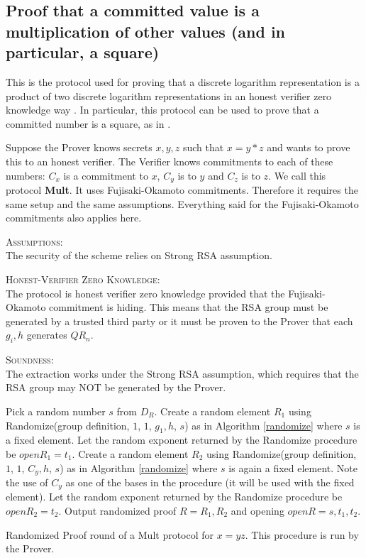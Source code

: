 \subsection{Proof that a committed value is a multiplication of other values (and in particular, a square)}

This is the protocol used for proving that a discrete logarithm representation is a product of two discrete logarithm representations in an honest verifier zero knowledge way \cite{FOcomm2}. In particular, this protocol can be used to prove that a committed number is a square, as in \cite{boudotInterval}.

Suppose the Prover knows secrets $x,y,z$ such that $x = y*z$ and wants to prove this to an honest verifier. The Verifier knows commitments to each of these numbers: $C_x$ is a commitment to $x$, $C_y$ is to $y$ and $C_z$ is to $z$. We call this protocol \textbf{Mult}. It uses Fujisaki-Okamoto commitments. Therefore it requires the same setup and the same assumptions. Everything said for the Fujisaki-Okamoto commitments also applies here.



\textsc{Assumptions}:\\
The security of the scheme relies on Strong RSA assumption.


\textsc{Honest-Verifier Zero Knowledge}:\\
The protocol is honest verifier zero knowledge provided that the Fujisaki-Okamoto commitment is hiding. This means that the RSA group must be generated by a trusted third party or it must be proven to the Prover that each $g_i,h$ generates $QR_n$.


\textsc{Soundness}:\\
The extraction works under the Strong RSA assumption, which requires that the RSA group may NOT be generated by the Prover.




\begin{algorithm}[H]\label{randProofUnknownMultiply}
\dontprintsemicolon

\BlankLine

 \;
\Indp
  Pick a random number $s$ from $D_R$. \;
  Create a random element $R_1$ using Randomize(group definition, $1$, $1$,  $g_1,h$, $s$) as in Algorithm \ref{randomize} where $s$ is a fixed element. Let the random exponent returned by the Randomize procedure be $openR_1 = t_1$. \;
  Create a random element $R_2$ using Randomize(group definition, $1$, $1$,  $C_y,h$, $s$) as in Algorithm \ref{randomize} where $s$ is again a fixed element. Note the use of $C_y$ as one of the bases in the procedure (it will be used with the fixed element). Let the random exponent returned by the Randomize procedure be $openR_2 = t_2$. \;
  Output randomized proof $R = R_1,R_2$ and opening $openR = s,t_1,t_2$. \;
\Indm

\caption{Randomized Proof round of a Mult protocol for $x = yz$. This procedure is run by the Prover.}
\end{algorithm}




